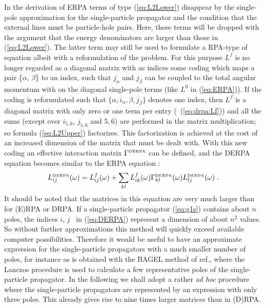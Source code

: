 In the derivation of ERPA\cite{Br90}
terms of type (\ref{eq:L2Lower}) disappear by the single-pole 
approximation for the single-particle propagator and the condition that the 
external lines must be particle-hole pairs. Here, these terms will be dropped 
with the argument that the energy denominators are larger than those in 
(\ref{eq:L2Lower}). The latter term may still be used to formulate a RPA-type 
of equation albeit with a reformulation of the problem. For this purpose
 $L^f$ is no longer 
regarded as a diagonal matrix with as indices some coding 
which maps a pair \{$\alpha$, $\beta$\} to an index, such that $j_\alpha$ 
and $j_\beta$ can be coupled to the total angular momentum with on the diagonal
single-pole terms (like $L^0$ in (\ref{eq:ERPA})).
If the coding is reformulated such that $\{\alpha,i_\alpha,\beta,j_\beta\}$ 
denotes one index, then 
$L^f$ is a diagonal matrix with only zero or one term per entry (\cf\ 
(\ref{eq:drpa:Lf}))
and all the sums (except over $i_{5,6}$, $j_{5,6}$ and $5,6$) are performed 
in the 
matrix multiplication; so formula (\ref{eq:L2Upper}) factorizes. 
This factorization is achieved
at the cost of an increased dimension of the matrix that must be dealt with.
With this new coding an effective interaction matrix 
$\Gamma^{\mbox{\tiny DERPA}}$ can be defined,
and the DERPA equation becomes similar to the ERPA equation%
\cite{BAD90}:
%
	\begin{equation}
		L^{\mbox{\tiny DERPA}}_{ij}(\omega)
	=
		L^f_{ij}(\omega)
	+ 
		\sum_{kl}
		L^f_{ik}(\omega)
		\Gamma^{\mbox{\tiny DERPA}}_{kl}(\omega)
		L^{\mbox{\tiny DERPA}}_{lj}(\omega)
	\;.
	\label{eq:DERPA}
	\end{equation}
%
It should be noted that the matrices in this equation are very much larger 
than for (E)RPA or DRPA. If a single-particle propagator  
(\ref{eq:g1s})
contains about $n$
poles, the indices $i$, $j$ \etc\ in (\ref{eq:DERPA}) 
represent a dimension of about $n^2$ values. 
So without further approximations this method will 
quickly exceed available computer possibilities. Therefore it would be useful to
 have an approximate expression for the single-particle propagators with a 
much smaller number of poles, for instance as is obtained with the BAGEL 
method of ref.\cite{MS93}, where the Lanczos procedure is used to calculate a 
few representative poles of the single-particle propagator. In the following we shall adopt a rather 
{\em ad hoc} procedure where the single-particle propagators are represented 
by an expression with only three poles. 
This already gives rise to nine times larger matrices than in (D)RPA. 

